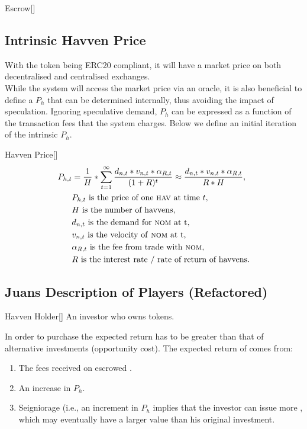 \begin{namedthm*}{Escrow}[]
\newpage

\subsection{Intrinsic Havven Price} With the \HAV{} token being ERC20 compliant, it will have a market price on both decentralised and centralised exchanges. \\

\noindent While the system will access the market price via an oracle, it is also beneficial to define a $P_h$ that can be determined internally, thus avoiding the impact of speculation. Ignoring speculative demand, $P_h$ can be expressed as a function of the transaction fees that the system charges. Below we define an initial iteration of the intrinsic $P_h$.

\begin{namedthm}{Havven Price}[]
\begin{align*} 
P_{h,t} &= \frac{1}{H}* \sum\limits_{t=1}^\infty \frac{d_{n,t} *v_{n,t} * \alpha_{R,t}}{(1+R)^t} \approx \frac{d_{n,t} *v_{n,t} * \alpha_{R,t}}{R * H}, \\
& P_{h,t} \text{ is the price of one \textsc{hav}{} at time } t, \\
& H \text{ is the number of havvens}, \\
& d_{n,t} \text{ is the demand for \textsc{nom}{} at t}, \\
& v_{n,t} \text{ is the velocity of \textsc{nom}{} at t}, \\
& \alpha_{R,t} \text{ is the fee from trade with \textsc{nom}{}}, \\
& R \text{ is the interest rate / rate of return of havvens}. \\
\end{align*}
\end{namedthm}

\newpage

\subsection{Juans Description of Players (Refactored)}
\begin{namedthm}{Havven Holder}[]
An investor who owns \HAV{} tokens.
\end{namedthm}

\noindent In order to purchase \HAV{} the expected return has to be greater than that of alternative investments (opportunity cost). The expected return of \HAV{} comes from:
\begin{enumerate}
\item{The fees received on escrowed \HAV{}.}
\item{An increase in $P_h$.}
\item{Seigniorage (i.e., an increment in $P_h$ implies that the investor can issue more \NOM{}, which may eventually have a larger value than his original investment.}
\end{enumerate}


\end{namedthm*}

